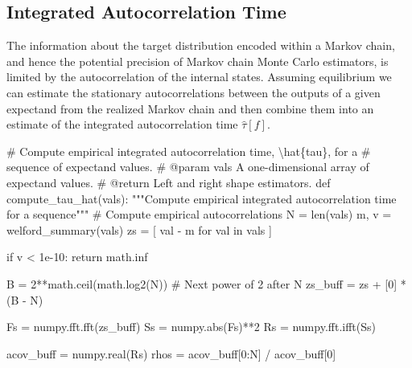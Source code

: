\documentclass[
  letterpaper,
  DIV=11,
  numbers=noendperiod]{scrartcl}
\newenvironment{Shaded}{\begin{snugshade}}{\end{snugshade}}
\newcommand{\BuiltInTok}[1]{\textcolor[rgb]{0.00,0.23,0.31}{#1}}
\newcommand{\CommentTok}[1]{\textcolor[rgb]{0.37,0.37,0.37}{#1}}
\newcommand{\ControlFlowTok}[1]{\textcolor[rgb]{0.00,0.23,0.31}{#1}}
\newcommand{\DecValTok}[1]{\textcolor[rgb]{0.68,0.00,0.00}{#1}}
\newcommand{\FloatTok}[1]{\textcolor[rgb]{0.68,0.00,0.00}{#1}}
\newcommand{\KeywordTok}[1]{\textcolor[rgb]{0.00,0.23,0.31}{#1}}
\newcommand{\NormalTok}[1]{\textcolor[rgb]{0.00,0.23,0.31}{#1}}
\newcommand{\OperatorTok}[1]{\textcolor[rgb]{0.37,0.37,0.37}{#1}}
\begin{document}
\subsection{Integrated Autocorrelation
Time}\label{integrated-autocorrelation-time}

The information about the target distribution encoded within a Markov
chain, and hence the potential precision of Markov chain Monte Carlo
estimators, is limited by the autocorrelation of the internal states.
Assuming equilibrium we can estimate the stationary autocorrelations
between the outputs of a given expectand from the realized Markov chain
and then combine them into an estimate of the integrated autocorrelation
time \(\hat{\tau}[f]\).

\begin{Shaded}
\begin{Highlighting}[]
\CommentTok{\# Compute empirical integrated autocorrelation time, \textbackslash{}hat\{tau\}, for a}
\CommentTok{\# sequence of expectand values.}
\CommentTok{\# @param vals A one{-}dimensional array of expectand values.}
\CommentTok{\# @return Left and right shape estimators.}
\KeywordTok{def}\NormalTok{ compute\_tau\_hat(vals):}
  \CommentTok{"""Compute empirical integrated autocorrelation time for a sequence"""}
  \CommentTok{\# Compute empirical autocorrelations}
\NormalTok{  N }\OperatorTok{=} \BuiltInTok{len}\NormalTok{(vals)}
\NormalTok{  m, v }\OperatorTok{=}\NormalTok{ welford\_summary(vals)}
\NormalTok{  zs }\OperatorTok{=}\NormalTok{ [ val }\OperatorTok{{-}}\NormalTok{ m }\ControlFlowTok{for}\NormalTok{ val }\KeywordTok{in}\NormalTok{ vals ]}
  
  \ControlFlowTok{if}\NormalTok{ v }\OperatorTok{\textless{}} \FloatTok{1e{-}10}\NormalTok{:}
    \ControlFlowTok{return}\NormalTok{ math.inf}
  
\NormalTok{  B }\OperatorTok{=} \DecValTok{2}\OperatorTok{**}\NormalTok{math.ceil(math.log2(N)) }\CommentTok{\# Next power of 2 after N}
\NormalTok{  zs\_buff }\OperatorTok{=}\NormalTok{ zs }\OperatorTok{+}\NormalTok{ [}\DecValTok{0}\NormalTok{] }\OperatorTok{*}\NormalTok{ (B }\OperatorTok{{-}}\NormalTok{ N)}
  
\NormalTok{  Fs }\OperatorTok{=}\NormalTok{ numpy.fft.fft(zs\_buff)}
\NormalTok{  Ss }\OperatorTok{=}\NormalTok{ numpy.}\BuiltInTok{abs}\NormalTok{(Fs)}\OperatorTok{**}\DecValTok{2}
\NormalTok{  Rs }\OperatorTok{=}\NormalTok{ numpy.fft.ifft(Ss)}

\NormalTok{  acov\_buff }\OperatorTok{=}\NormalTok{ numpy.real(Rs)}
\NormalTok{  rhos }\OperatorTok{=}\NormalTok{ acov\_buff[}\DecValTok{0}\NormalTok{:N] }\OperatorTok{/}\NormalTok{ acov\_buff[}\DecValTok{0}\NormalTok{]}
  

\end{Highlighting}
\end{Shaded}
\end{document}
